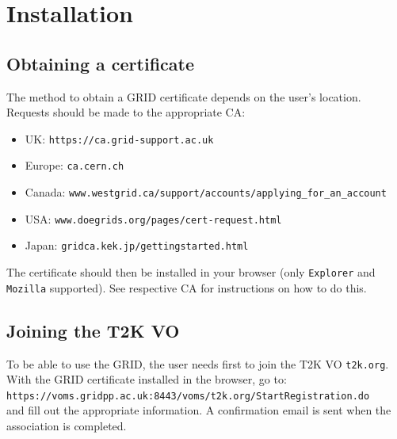 \documentclass[11pt]{article}
\begin{document}
\clearpage
\section{Installation}
\label{sec:install}

\subsection{Obtaining a certificate}
The method to obtain a GRID certificate depends on the user's
location. Requests should be made to the appropriate CA:

\begin{itemize}
\item UK: \verb+https://ca.grid-support.ac.uk+
\item Europe: \verb+ca.cern.ch+
\item Canada: \verb+www.westgrid.ca/support/accounts/applying_for_an_account+
\item USA: \verb+www.doegrids.org/pages/cert-request.html+
\item Japan: \verb+gridca.kek.jp/gettingstarted.html+
\end{itemize}

The certificate should then be installed in your browser (only
\verb+Explorer+ and \verb+Mozilla+ supported). See respective CA for
instructions on how to do this.

\subsection{Joining the T2K VO}
To be able to use the GRID, the user needs first to join the T2K VO
\verb+t2k.org+. With the GRID certificate installed in the browser, go
to:\\
\verb+https://voms.gridpp.ac.uk:8443/voms/t2k.org/StartRegistration.do+\\
and fill out the appropriate information. A confirmation email is sent
when the association is completed.
\end{document}
